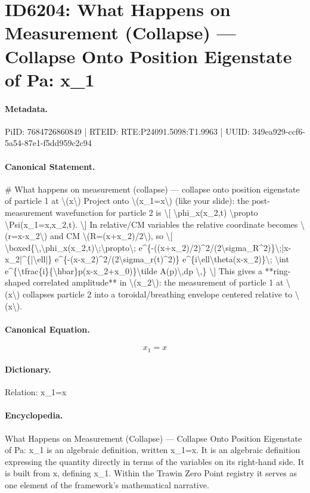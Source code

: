 \section*{ID6204: What Happens on Measurement (Collapse) — Collapse Onto Position Eigenstate of Pa: x\_1}
\paragraph{Metadata.}
PiID: 7684726860849 | RTEID: RTE:P24091.5098:T1.9963 | UUID: 349ea929-ccf6-5a54-87e1-f5dd959c2c94

\paragraph{Canonical Statement.}
\# What happens on measurement (collapse) — collapse onto position eigenstate of particle 1 at \textbackslash{}(x\textbackslash{}) Project onto \textbackslash{}(x\_1=x\textbackslash{}) (like your slide): the post-measurement wavefunction for particle 2 is \textbackslash{}[ \textbackslash{}phi\_x(x\_2,t) \textbackslash{}propto \textbackslash{}Psi(x\_1=x,x\_2,t). \textbackslash{}] In relative/CM variables the relative coordinate becomes \textbackslash{}(r=x-x\_2\textbackslash{}) and CM \textbackslash{}(R=(x+x\_2)/2\textbackslash{}), so \textbackslash{}[ \textbackslash{}boxed\{\textbackslash{},\textbackslash{}phi\_x(x\_2,t)\textbackslash{};\textbackslash{}propto\textbackslash{}; e\textasciicircum{}\{-((x+x\_2)/2)\textasciicircum{}2/(2\textbackslash{}sigma\_R\textasciicircum{}2)\}\textbackslash{};|x-x\_2|\textasciicircum{}\{|\textbackslash{}ell|\} e\textasciicircum{}\{-(x-x\_2)\textasciicircum{}2/(2\textbackslash{}sigma\_r(t)\textasciicircum{}2)\} e\textasciicircum{}\{i\textbackslash{}ell\textbackslash{}theta(x-x\_2)\}\textbackslash{}; \textbackslash{}int e\textasciicircum{}\{\textbackslash{}tfrac\{i\}\{\textbackslash{}hbar\}p(x-x\_2+x\_0)\}\textbackslash{}tilde A(p)\textbackslash{},dp \textbackslash{},\} \textbackslash{}] This gives a **ring-shaped correlated amplitude** in \textbackslash{}(x\_2\textbackslash{}): the measurement of particle 1 at \textbackslash{}(x\textbackslash{}) collapses particle 2 into a toroidal/breathing envelope centered relative to \textbackslash{}(x\textbackslash{}).

\paragraph{Canonical Equation.}
\[
x_1=x
\]

\paragraph{Dictionary.}
Relation: x\_1=x

\paragraph{Encyclopedia.}
What Happens on Measurement (Collapse) — Collapse Onto Position Eigenstate of Pa: x\_1 is an algebraic definition, written x\_1=x. It is an algebraic definition expressing the quantity directly in terms of the variables on its right-hand side. It is built from x, defining x\_1. Within the Trawin Zero Point registry it serves as one element of the framework's mathematical narrative.
